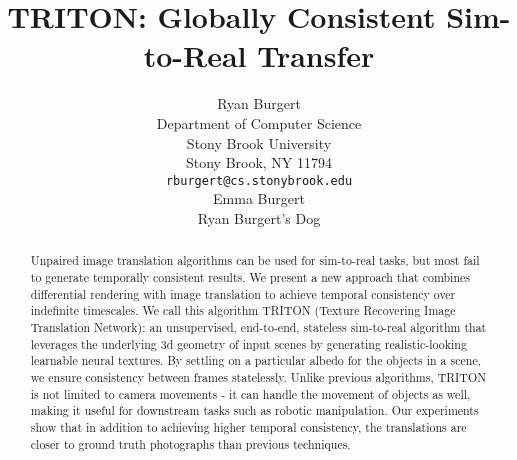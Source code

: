 \documentclass{article}
\title{TRITON: Globally Consistent Sim-to-Real Transfer}
\author{%
	Ryan Burgert \\
	Department of Computer Science\\
	Stony Brook University\\
	Stony Brook, NY 11794 \\
	\texttt{rburgert@cs.stonybrook.edu} \\
	\And
	Emma Burgert \\
	Ryan Burgert's Dog\\
}
\begin{document}
\maketitle


\begin{abstract}


	Unpaired image translation algorithms can be used for sim-to-real tasks, but most fail to generate temporally consistent results.
	We present a new approach that combines differential rendering with image translation to achieve temporal consistency over indefinite timescales.
%
	We call this algorithm TRITON (Texture Recovering Image Translation Network): an unsupervised, end-to-end, stateless sim-to-real algorithm that 
	leverages the underlying 3d geometry of input scenes by generating realistic-looking learnable neural textures.
%
	By settling on a particular albedo for the objects in a scene, we ensure consistency between frames statelessly.
	Unlike previous algorithms, TRITON is not limited to camera movements - it can handle the movement of objects as well, making it useful for downstream tasks such as robotic manipulation.
	Our experiments show that in addition to achieving higher temporal consistency, the translations are closer to ground truth photographs than previous techniques.
\end{abstract}


\end{document}
